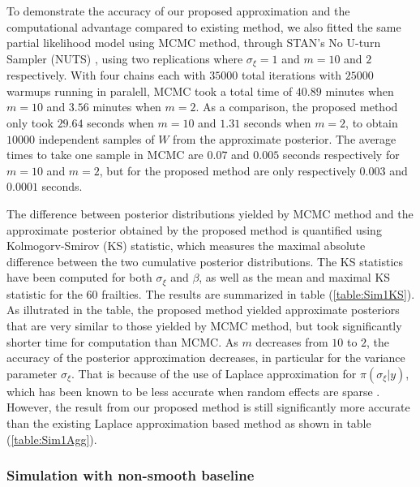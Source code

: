 \documentclass[ba]{imsart}
\begin{document}
To demonstrate the accuracy of our proposed approximation and the computational advantage compared to existing method, we also fitted the same partial likelihood model using MCMC method, through STAN's No U-turn Sampler (NUTS) \citep{NUTS}, using two replications where $\sigma_\xi = 1$ and $m = 10$ and $2$ respectively. With four chains each with $35000$ total iterations with $25000$ warmups running in paralell, MCMC took a total time of $40.89$ minutes when $m = 10$ and $3.56$ minutes when $m = 2$. As a comparison, the proposed method only took $29.64$ seconds when $m = 10$ and $1.31$ seconds when $m = 2$, to obtain $10000$ independent samples of $W$ from the approximate posterior. The average times to take one sample in MCMC are $0.07$ and $0.005$ seconds respectively for $m = 10$ and $m = 2$, but for the proposed method are only respectively $0.003$ and $0.0001$ seconds.


The difference between posterior distributions yielded by MCMC method and the approximate posterior obtained by the proposed method is quantified using Kolmogorv-Smirov (KS) statistic, which measures the maximal absolute difference between the two cumulative posterior distributions. The KS statistics have been computed for both $\sigma_\xi$ and $\beta$, as well as the mean and maximal KS statistic for the $60$ frailties. The results are summarized in table (\ref{table:Sim1KS}). As illutrated in the table, the proposed method yielded approximate posteriors that are very similar to those yielded by MCMC method, but took significantly shorter time for computation than MCMC. As $m$ decreases from $10$ to $2$, the accuracy of the posterior approximation decreases, in particular for the variance parameter $\sigma_\xi$. That is because of the use of Laplace approximation for $\pi(\sigma_\xi|y)$, which has been known to be less accurate when random effects are sparse \citep{Ogden2013ASR}. However, the result from our proposed method is still significantly more accurate than the existing Laplace approximation based method as shown in table (\ref{table:Sim1Agg}).



\subsubsection{Simulation with non-smooth baseline}\label{subsubsec:sim2}
\end{document}
